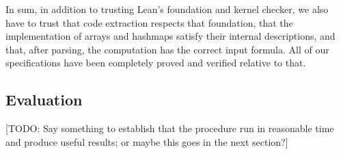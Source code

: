 In sum, in addition to trusting Lean's foundation and kernel checker,
we also have to trust that code extraction respects that foundation,
that the implementation of arrays and hashmaps satisfy their internal descriptions,
and that, after parsing, the computation has the correct input formula.
All of our specifications have been completely proved and verified relative to that.

\subsection{Evaluation}

[TODO: Say something to establish that the procedure run in reasonable time and produce
useful results; or maybe this goes in the next section?]